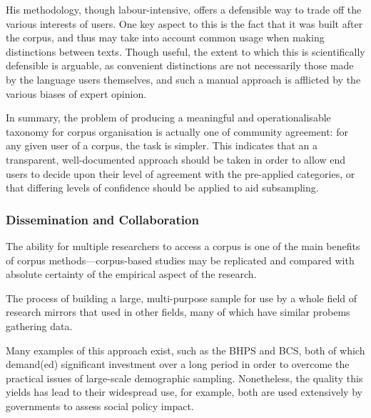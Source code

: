 His methodology, though labour-intensive, offers a defensible way to trade off the various interests of users.  One key aspect to this is the fact that it was built after the corpus, and thus may take into account common usage when making distinctions between texts.  Though useful, the extent to which this is scientifically defensible is arguable, as convenient distinctions are not necessarily those made by the language users themselves, and such a manual approach is afflicted by the various biases of expert opinion.



In summary, the problem of producing a meaningful and operationalisable taxonomy for corpus organisation is actually one of community agreement: for any given user of a corpus, the task is simpler.  This indicates that an a transparent, well-documented approach should be taken in order to allow end users to decide upon their level of agreement with the pre-applied categories, or that differing levels of confidence should be applied to aid subsampling.









\subsubsection{Dissemination and Collaboration}
The ability for multiple researchers to access a corpus is one of the main benefits of corpus methods---corpus-based studies may be replicated and compared with absolute certainty of the empirical aspect of the research.

The process of building a large, multi-purpose sample for use by a whole field of research mirrors that used in other fields, many of which have similar probems gathering data.

Many examples of this approach exist, such as the BHPS and BCS\cite{taylor1996british,hough1983british}, both of which demand(ed) significant investment over a long period in order to overcome the practical issues of large-scale demographic sampling.  Nonetheless, the quality this yields has lead to their widespread use, for example, both are used extensively by governments to assess social policy impact.

